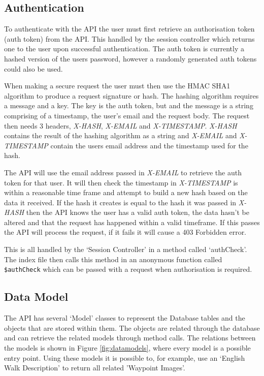 \documentclass[11pt,a4paper]{report}
\begin{document}
\subsection{Authentication}
\label{sec:authDesign}

To authenticate with the API the user must first retrieve an authorisation token (auth token) from the API. This handled by the session controller which returns one to the user upon successful authentication. The auth token is currently a hashed version of the users password, however a randomly generated auth tokens could also be used.

When making a secure request the user must then use the HMAC SHA1 algorithm to produce a request signature or hash. The hashing algorithm requires a message and a key. The key is the auth token, but and the message is a string comprising of a timestamp, the user's email and the request body. The request then needs 3 headers, \emph{X-HASH}, \emph{X-EMAIL} and \emph{X-TIMESTAMP}. \emph{X-HASH} contains the result of the hashing algorithm as a string and \emph{X-EMAIL} and \emph{X-TIMESTAMP} contain the users email address and the timestamp used for the hash.

The API will use the email address passed in \emph{X-EMAIL} to retrieve the auth token for that user. It will then check the timestamp in \emph{X-TIMESTAMP} is within a reasonable time frame and attempt to build a new hash based on the data it received. If the hash it creates is equal to the hash it was passed in \emph{X-HASH} then the API knows the user has a valid auth token, the data hasn't be altered and that the request has happened within a valid timeframe. If this passes the API will process the request, if it fails it will cause a 403 Forbidden error. 

This is all handled by the `Session Controller' in a method called `authCheck'. The index file then calls this method in an anonymous function called \lstinline{$authCheck} which can be passed with a request when authorisation is required.

\subsection{Data Model}
\label{sec:api:class}
The API has several `Model' classes to represent the Database tables and the objects that are stored within them. The objects are related through the database and can retrieve the related models through method calls. The relations between the models is shown in Figure \ref{fig:datamodels}, where every model is a possible entry point. Using these models it is possible to, for example, use an `English Walk Description' to return all related 'Waypoint Images'. 
\end{document}

